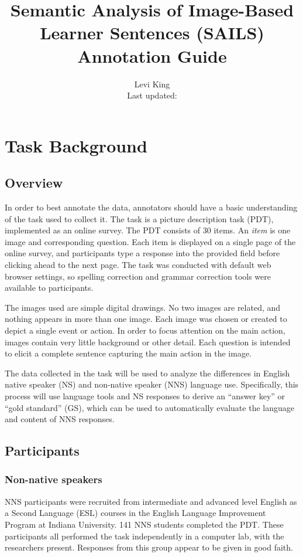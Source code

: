 \documentclass[12pt,notitlepage]{article}
\title{\large{Semantic Analysis of Image-Based Learner Sentences (SAILS)} \\ Annotation Guide}
\author{Levi King \\ Last updated: \vspace{-1em}}
\begin{document}
\maketitle

\section{Task Background} \label{sec:background}

\subsection{Overview}
In order to best annotate the data, annotators should have a basic understanding of the task used to collect it. The task is a picture description task (PDT), implemented as an online survey. The PDT consists of 30 items. An \textit{item} is one image and corresponding question. Each item is displayed on a single page of the online survey, and participants type a response into the provided field before clicking ahead to the next page. The task was conducted with default web browser settings, so spelling correction and grammar correction tools were available to participants.

The images used are simple digital drawings. No two images are related, and nothing appears in more than one image. Each image was chosen or created to depict a single event or action. In order to focus attention on the main action, images contain very little background or other detail. Each question is intended to elicit a complete sentence capturing the main action in the image. 

The data collected in the task will be used to analyze the differences in English native speaker (NS) and non-native speaker (NNS) language use. Specifically, this process will use language tools and NS responses to derive an ``answer key'' or ``gold standard'' (GS), which can be used to automatically evaluate the language and content of NNS responses.

\subsection{Participants}
\subsubsection{Non-native speakers}
NNS participants were recruited from intermediate and advanced level English as a Second Language (ESL) courses in the English Language Improvement Program at Indiana University. 141 NNS students completed the PDT. These participants all performed the task independently in a computer lab, with the researchers present. Responses from this group appear to be given in good faith.
\end{document}
